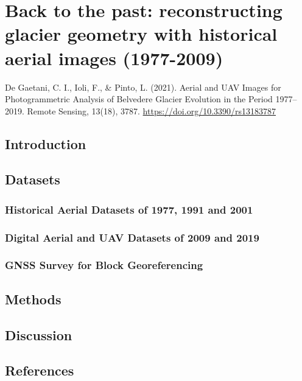 \graphicspath{{figures/chapter2/}}

\chapter{Back to the past: reconstructing glacier geometry with historical aerial images
  (1977-2009)}\label{ch:2}

\vfill


\noindent De Gaetani, C. I., Ioli, F., \& Pinto, L. (2021). Aerial and UAV Images for
Photogrammetric Analysis of Belvedere Glacier Evolution in the Period 1977–2019. Remote
Sensing, 13(18), 3787. \url{https://doi.org/10.3390/rs13183787}

\newpage

\section{Introduction}\label{sec:4:introduction}

\section{Datasets}\label{sec:4:datasets}

\subsection{Historical Aerial Datasets of 1977, 1991 and 2001}

\subsection{Digital Aerial and UAV Datasets of 2009 and 2019}

\subsection{GNSS Survey for Block Georeferencing}

\section{Methods}\label{sec:4:methods}

\section{Discussion}\label{sec:4:discussion}

\section{References}



